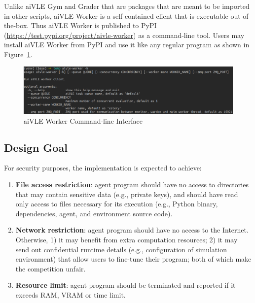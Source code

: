 Unlike aiVLE Gym and Grader that are packages that are meant to be imported in other scripts, aiVLE Worker is a self-contained client that is executable out-of-the-box. Thus aiVLE Worker is published to PyPI (\href{https://test.pypi.org/project/aivle-worker}{https://test.pypi.org/project/aivle-worker}) as a command-line tool. Users may install aiVLE Worker from PyPI and use it like any regular program as shown in Figure~\ref{fig:aivle-worker-cli}.

\begin{figure}[H]
    \centering
    \includegraphics[width=\textwidth]{images/aivle-worker-cli.png}
    \caption{aiVLE Worker Command-line Interface}
    \label{fig:aivle-worker-cli}
\end{figure}

\subsection{Design Goal}
\label{ss:aivle-worker-design-goal}
For security purposes, the implementation is expected to achieve:
\begin{enumerate}
    \item \textbf{File access restriction}: agent program should have no access to directories that may contain sensitive data (e.g., private keys), and should have read only access to files necessary for its execution (e.g., Python binary, dependencies, agent, and environment source code).
    \item \textbf{Network restriction}: agent program should have no access to the Internet. Otherwise, 1) it may benefit from extra computation resources; 2) it may send out confidential runtime details (e.g., configuration of simulation environment) that allow users to fine-tune their program; both of which make the competition unfair.
    \item \textbf{Resource limit}: agent program should be terminated and reported if it exceeds RAM, VRAM or time limit.
\end{enumerate}

